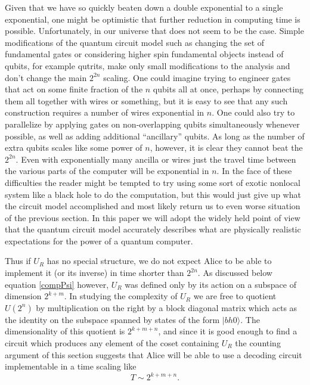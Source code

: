 \documentclass[12pt]{article}
\newcommand{\be}{\begin{equation}}
\newcommand{\ee}{\end{equation}}
\newcommand{\ran}{\rangle}
\begin{document}
Given that we have so quickly beaten down a double exponential to a single exponential, one might be optimistic that further reduction in computing time is possible.  Unfortunately, in our universe that does not seem to be the case.  Simple modifications of the quantum circuit model such as changing the set of fundamental gates or considering higher spin fundamental objects instead of qubits, for example qutrits, make only small modifications to the analysis and don't change the main $2^{2n}$ scaling.  One could imagine trying to engineer gates that act on some finite fraction of the $n$ qubits all at once, perhaps by connecting them all together with wires or something, but it is easy to see that any such construction requires a number of wires exponential in $n$.  One could also try to parallelize by applying gates on non-overlapping qubits simultaneously whenever possible, as well as adding additional ``ancillary'' qubits.  As long as the number of extra qubits scales like some power of $n$, however, it is clear they cannot beat the $2^{2n}$. Even with exponentially many ancilla or wires just the travel time between the various parts of the computer will be exponential in $n$.  In the face of these difficulties the reader might be tempted to try using some sort of exotic nonlocal system like a black hole to do the computation, but this would just give up what the circuit model accomplished and most likely return us to even worse situation of the previous section.  In this paper we will adopt the widely held point of view that the quantum circuit model accurately describes what are physically realistic expectations for the power of a quantum computer.  

Thus if $U_{R}$ has no special structure, we do not expect Alice to be able to implement it (or its inverse) in time shorter than $2^{2n}$.  As discussed below equation \eqref{compPsi} however, $U_R$ was defined only by its action on a subspace of dimension $2^{k+m}$.  In studying the complexity of $U_R$ we are free to quotient $U(2^n)$ by multiplication on the right by a block diagonal matrix which acts as the identity on the subspace spanned by states of the form $|bh0\ran$.  The dimensionality of this quotient is $2^{k+m+n}$, and since it is good enough to find a circuit which produces any element of the coset containing $U_R$ the counting argument of this section suggests that Alice will be able to use a decoding circuit implementable in a time scaling like 
\be\label{dectime}
T\sim2^{k+m+n}.
\ee
\end{document}
